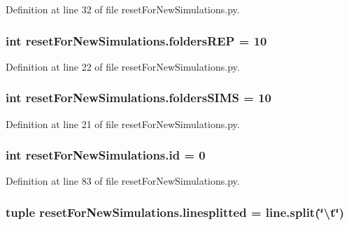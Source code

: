 Definition at line 32 of file reset\-For\-New\-Simulations.\-py.

\hypertarget{namespacereset_for_new_simulations_a3869e711bac998c005313abd611c6158}{
\subsubsection[{folders\-R\-E\-P}]{\setlength{\rightskip}{0pt plus 5cm}int reset\-For\-New\-Simulations.\-folders\-R\-E\-P = 10}}\label{namespacereset_for_new_simulations_a3869e711bac998c005313abd611c6158}


Definition at line 22 of file reset\-For\-New\-Simulations.\-py.

\hypertarget{namespacereset_for_new_simulations_a60b4005683b2bced2f3e0b22a66abd47}{
\subsubsection[{folders\-S\-I\-M\-S}]{\setlength{\rightskip}{0pt plus 5cm}int reset\-For\-New\-Simulations.\-folders\-S\-I\-M\-S = 10}}\label{namespacereset_for_new_simulations_a60b4005683b2bced2f3e0b22a66abd47}


Definition at line 21 of file reset\-For\-New\-Simulations.\-py.

\hypertarget{namespacereset_for_new_simulations_a9defa7f80f548a96cc89f83a6140727d}{
\subsubsection[{id}]{\setlength{\rightskip}{0pt plus 5cm}int reset\-For\-New\-Simulations.\-id = 0}}\label{namespacereset_for_new_simulations_a9defa7f80f548a96cc89f83a6140727d}


Definition at line 83 of file reset\-For\-New\-Simulations.\-py.

\hypertarget{namespacereset_for_new_simulations_a8479d45d2399e5ddd429e2dc4961204a}{
\subsubsection[{linesplitted}]{\setlength{\rightskip}{0pt plus 5cm}tuple reset\-For\-New\-Simulations.\-linesplitted = {\bf line.\-split}(\char`\"{}\textbackslash{}t\char`\"{})}}\label{namespacereset_for_new_simulations_a8479d45d2399e5ddd429e2dc4961204a}


